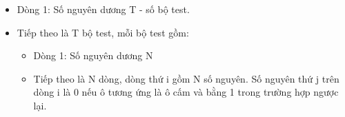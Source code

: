 \begin{itemize}
	\item     Dòng 1: Số nguyên dương T - số bộ test.   
	\item     Tiếp theo là T bộ test, mỗi bộ test gồm:    
\begin{itemize}
	\item       Dòng 1: Số nguyên dương N     
	\item       Tiếp theo là N dòng, dòng thứ i gồm N số nguyên. Số nguyên thứ j trên dòng i là 0 nếu ô tương ứng là ô cấm và bằng 1 trong trường hợp ngược lại.     
\end{itemize}
\end{itemize}